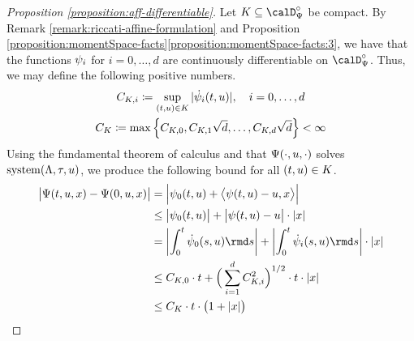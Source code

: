 \begin{proof}[Proposition \ref{proposition:aff-differentiable}]
  \label{proof:proposition:aff-differentiable}
  Let $K \subseteq \momentSpace^\circ$ be compact.
  By Remark \ref{remark:riccati-affine-formulation} and Proposition \ref{proposition:momentSpace-facts}\ref{proposition:momentSpace-facts:3}, we have that the functions $\psi_i$ for $i = 0, \ldots, d$ are continuously differentiable on $\momentSpace^\circ$.
  Thus, we may define the following positive numbers.
  \begin{gather*}
    C_{K,i} \coloneqq \sup_{(t, u) \in K} |\dot{\psi}_i(t, u)|, \quad i = 0, \ldots, d \\
    C_K \coloneqq \max\Big\{ C_{K,0}, C_{K,1}\sqrt d, \ldots, C_{K,d} \sqrt d \Big\} < \infty
  \end{gather*}
  Using the fundamental theorem of calculus and that $\Psi(\cdot,u,\cdot)$ solves $\operatorname{system}(\Lambda,\tau,u)$, we produce the following bound for all $(t, u) \in K$.
  \begin{align*}
    \big|\aff(t, \momentVar, \stateVar) - \aff(0, \momentVar, \stateVar)\big| 
    &= \Big| \affPart_0(t, \momentVar) + \bprj{\affPart(t, \momentVar) - \momentVar}{\stateVar} \Big| \\
    &\leq \big|\affPart_0(t,\momentVar)\big| + \big|\affPart(t,\momentVar) - \momentVar\big| \cdot |\stateVar| \\
    &= \left| \int_0^t \dot\affPart_0(s,\momentVar) \rmd s \right|
      + \left| \int_0^t \dot\affPart_i(s,\momentVar) \rmd s \right| \cdot |\stateVar| \\
    &\leq C_{K,0} \cdot t + \Big( \sum_{i=1}^d C_{K,i}^2 \Big)^{1/2} \cdot t \cdot |\stateVar| \\
    &\leq C_K  \cdot t \cdot \big( 1 + |\stateVar| \big)
  \end{align*}
\end{proof}
